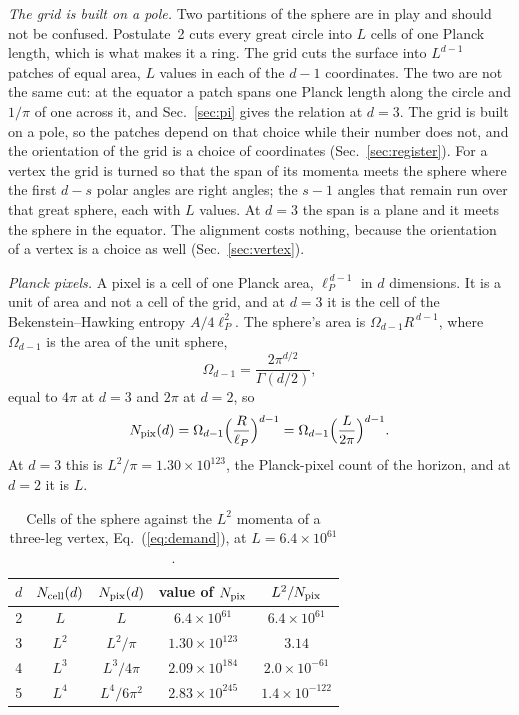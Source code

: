 \documentclass[aps,prd,twocolumn,superscriptaddress,nofootinbib]{revtex4-2}
\begin{document}
\textit{The grid is built on a pole.} Two partitions of the sphere are in play and should not be confused. Postulate~2 cuts every great circle into $L$ cells of one Planck length, which is what makes it a ring. The grid cuts the surface into $L^{d-1}$ patches of equal area, $L$ values in each of the $d-1$ coordinates. The two are not the same cut: at the equator a patch spans one Planck length along the circle and $1/\pi$ of one across it, and Sec.~\ref{sec:pi} gives the relation at $d = 3$. The grid is built on a pole, so the patches depend on that choice while their number does not, and the orientation of the grid is a choice of coordinates (Sec.~\ref{sec:register}). For a vertex the grid is turned so that the span of its momenta meets the sphere where the first $d-s$ polar angles are right angles; the $s-1$ angles that remain run over that great sphere, each with $L$ values. At $d = 3$ the span is a plane and it meets the sphere in the equator. The alignment costs nothing, because the orientation of a vertex is a choice as well (Sec.~\ref{sec:vertex}).

\textit{Planck pixels.} A pixel is a cell of one Planck area, $\ell_P^{\,d-1}$ in $d$ dimensions. It is a unit of area and not a cell of the grid, and at $d = 3$ it is the cell of the Bekenstein--Hawking entropy $A/4\ell_P^2$. The sphere's area is $\Omega_{d-1}R^{\,d-1}$, where $\Omega_{d-1}$ is the area of the unit sphere,
\begin{equation}
\Omega_{d-1} = \frac{2\pi^{d/2}}{\Gamma(d/2)},
\label{eq:omega}
\end{equation}
equal to $4\pi$ at $d=3$ and $2\pi$ at $d=2$, so
\begin{equation}
N_{\rm pix}(d) = \Omega_{d-1}\Big(\frac{R}{\ell_P}\Big)^{d-1} = \Omega_{d-1}\Big(\frac{L}{2\pi}\Big)^{d-1}.
\label{eq:supply}
\end{equation}
At $d=3$ this is $L^2/\pi = 1.30\times10^{123}$, the Planck-pixel count of the horizon, and at $d=2$ it is $L$.

\begin{table}[t]
\caption{Cells of the sphere against the $L^2$ momenta of a three-leg vertex, Eq.~(\ref{eq:demand}), at $L = 6.4\times10^{61}$.}
\label{tab:count}
\begin{ruledtabular}
\begin{tabular}{ccccc}
$d$ & $N_{\rm cell}(d)$ & $N_{\rm pix}(d)$ & value of $N_{\rm pix}$ & $L^2/N_{\rm pix}$ \\
\hline
2 & $L$ & $L$ & $6.4\times10^{61}$ & $6.4\times10^{61}$ \\
3 & $L^2$ & $L^2/\pi$ & $1.30\times10^{123}$ & $3.14$ \\
4 & $L^3$ & $L^3/4\pi$ & $2.09\times10^{184}$ & $2.0\times10^{-61}$ \\
5 & $L^4$ & $L^4/6\pi^2$ & $2.83\times10^{245}$ & $1.4\times10^{-122}$ \\
\end{tabular}
\end{ruledtabular}
\end{table}
\end{document}
